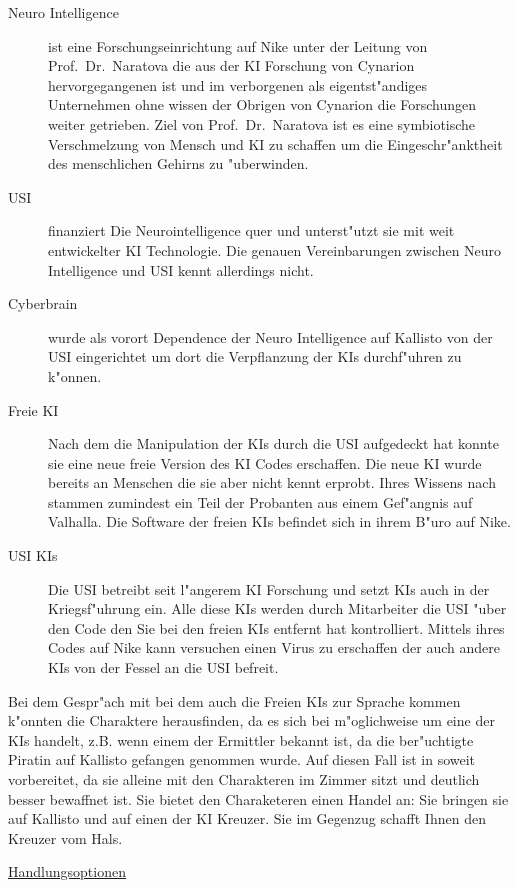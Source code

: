 \begin{description}
	\item[Neuro Intelligence] ist eine Forschungseinrichtung auf Nike unter der Leitung von Prof.~Dr.~Naratova die aus der KI Forschung von 	Cynarion hervorgegangenen ist und im verborgenen als eigentst"andiges Unternehmen ohne wissen der Obrigen von Cynarion die 				Forschungen weiter getrieben. Ziel von Prof.~Dr.~Naratova ist es eine symbiotische Verschmelzung von Mensch und KI zu schaffen um 		die Eingeschr"anktheit des menschlichen Gehirns zu "uberwinden.
	\item[USI] finanziert Die Neurointelligence quer und unterst"utzt sie mit weit entwickelter KI Technologie. Die genauen Vereinbarungen 
		zwischen Neuro Intelligence und USI kennt \ml{} allerdings nicht.
	\item[Cyberbrain] wurde als vorort Dependence der Neuro Intelligence auf Kallisto von der USI eingerichtet um dort die 				
		Verpflanzung der KIs durchf"uhren zu k"onnen.
	\item[Freie KI] Nach dem \ml{} die Manipulation der KIs durch die USI aufgedeckt hat konnte sie eine neue freie Version des KI Codes 	
		erschaffen. Die neue KI wurde bereits an Menschen die sie aber nicht kennt erprobt. Ihres Wissens nach stammen zumindest ein Teil der Probanten aus einem Gef"angnis auf Valhalla. Die Software der freien KIs befindet sich in ihrem B"uro auf Nike.
	\item[USI KIs] Die USI betreibt seit l"angerem KI Forschung und setzt KIs auch in der Kriegsf"uhrung ein. Alle diese KIs werden 
		durch Mitarbeiter die USI "uber den Code den Sie bei den freien KIs entfernt hat kontrolliert. Mittels ihres Codes auf Nike kann \ml{} versuchen einen Virus zu erschaffen der auch andere KIs von der Fessel an die USI befreit.
\end{description}

\underline{\xl{}} Bei dem Gespr"ach mit \ml{} bei dem auch die Freien KIs zur Sprache kommen k"onnten die Charaktere herausfinden, da\3 es sich bei \xl{} m"oglichweise um eine der KIs handelt, z.B. wenn einem der Ermittler bekannt ist, da\3 die ber"uchtigte Piratin auf Kallisto gefangen genommen wurde. Auf diesen Fall ist \xl{} in soweit vorbereitet, da\3 sie alleine mit den Charakteren im Zimmer sitzt und deutlich besser bewaffnet ist. Sie bietet den Charaketeren einen Handel an: Sie bringen sie auf Kallisto und auf einen der KI Kreuzer. Sie im Gegenzug schafft Ihnen den Kreuzer vom Hals.

\underline{Handlungsoptionen}

